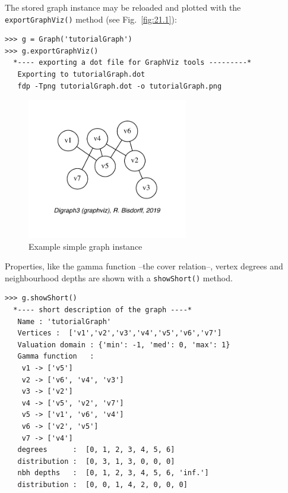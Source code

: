The stored graph instance may be reloaded and plotted with the \texttt{export\-GraphViz()} method (see Fig.~\vref{fig:21.1}):
\begin{lstlisting}
>>> g = Graph('tutorialGraph')
>>> g.exportGraphViz()
  *---- exporting a dot file for GraphViz tools ---------*
   Exporting to tutorialGraph.dot
   fdp -Tpng tutorialGraph.dot -o tutorialGraph.png
\end{lstlisting}
\begin{figure}[ht]
\sidecaption[t]
\includegraphics[width=7cm]{Figures/21-1-tutorialGraph.pdf}
\caption{Example simple graph instance} 
\label{fig:21.1}       %
\end{figure}

Properties, like the gamma function --the cover relation--, vertex degrees and neighbourhood depths are shown with a \texttt{showShort()} method. 
\begin{lstlisting}[caption={Inspecting a graph instance},label=list:21.3]
>>> g.showShort()
  *---- short description of the graph ----*
   Name : 'tutorialGraph'
   Vertices :  ['v1','v2','v3','v4','v5','v6','v7']
   Valuation domain : {'min': -1, 'med': 0, 'max': 1}
   Gamma function   : 
    v1 -> ['v5']
    v2 -> ['v6', 'v4', 'v3']
    v3 -> ['v2']
    v4 -> ['v5', 'v2', 'v7']
    v5 -> ['v1', 'v6', 'v4']
    v6 -> ['v2', 'v5']
    v7 -> ['v4']
   degrees      :  [0, 1, 2, 3, 4, 5, 6]
   distribution :  [0, 3, 1, 3, 0, 0, 0]
   nbh depths   :  [0, 1, 2, 3, 4, 5, 6, 'inf.']
   distribution :  [0, 0, 1, 4, 2, 0, 0, 0]
\end{lstlisting}


